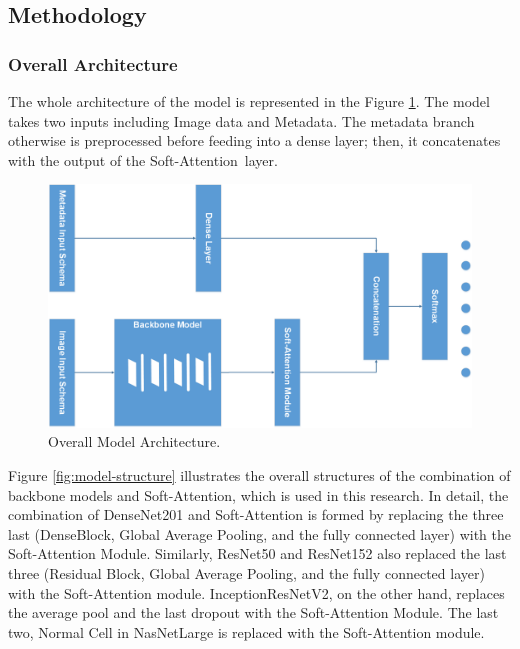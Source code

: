 \documentclass[sensors,article,accept,pdftex,moreauthors]{Definitions/mdpi}
\begin{document}
	\subsection{Methodology}
	\subsubsection{Overall Architecture}
	The whole architecture of the model is represented in the Figure \ref{fig:main-model}. The model takes two inputs including Image data and Metadata. The metadata branch otherwise is preprocessed before feeding into a dense layer; then, it concatenates with the output of the Soft-Attention~layer. 
	
	\begin{figure}[H]
		\includegraphics[width=0.8\linewidth]{Definitions/MainModel - Model Form}
		\caption{Overall Model Architecture.}
		\label{fig:main-model}
	\end{figure}
	
	Figure \ref{fig:model-structure} illustrates the overall structures of the combination of backbone models and Soft-Attention, which is used in this research. In detail, the combination of DenseNet201 and Soft-Attention is formed by replacing the three last (DenseBlock, Global Average Pooling, and the fully connected layer) with the Soft-Attention Module. Similarly, ResNet50 and ResNet152 also replaced the last three (Residual Block, Global Average Pooling, and the fully connected layer) with the Soft-Attention module. InceptionResNetV2, on the other hand, replaces the average pool and the last dropout with the Soft-Attention Module. The last two, Normal Cell in NasNetLarge is replaced with the Soft-Attention module. 
	
\end{document}
